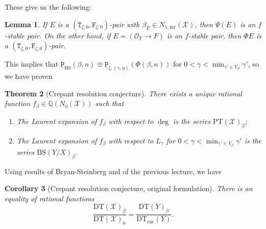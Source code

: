 \documentclass{amsart}
\newtheorem{thm}{Theorem}[section]
\newtheorem{cor}[thm]{Corollary}
\newtheorem{lem}[thm]{Lemma}
\theoremstyle{definition}
\theoremstyle{remark}
\theoremstyle{plain}
\theoremstyle{definition}
\theoremstyle{remark}
\newcommand{\Q}{\mathbb{Q}}
\newcommand{\mc}[1]{\mathcal{#1}}
\newcommand{\mr}[1]{\mathrm{#1}}
\newcommand{\mt}[1]{\mathtt{#1}}
\newcommand{\ul}[1]{\underline{#1}}
\newcommand{\1}{\mathbf{1}}
\newcommand{\2}{\mathbf{2}}
\newcommand{\3}{\mathbf{3}}
\begin{document}
These give us the following:
\begin{lem}
    If $E$ is a $(\mt{T}_{\zeta, 0}, \mt{F}_{\zeta, 0})$-pair with $\beta_E \in N_{1,\mr{mr}}(\mc{X})$, then $\Psi(E)$ is an $f$-stable pair. On the other hand, if $E = (\mc{O}_Y \to F)$ is an $f$-stable pair, then $\Phi E$ is a $(\mt{T}_{\zeta, 0}, \mt{F}_{\zeta, 0})$-pair.
\end{lem}

This implies that $\mt{\ul{P}}_{\mr{BS}}(\beta, n) \cong \mt{\ul{P}}_{\zeta, (\gamma,\eta)}(\Phi(\beta, n))$ for $0 < \gamma < \min_{\gamma' \in V_{\beta}} \gamma'$, so we have proven

\begin{thm}[Crepant resolution conjecture]
    There exists a unique rational function $f_{\beta} \in \Q(N_0(\mc{X}))$ such that
    \begin{enumerate}
        \item The Laurent expansion of $f_{\beta}$ with respect to $\deg$ is the series $\mr{PT}(\mc{X})_{\beta}$;
        \item The Laurent expansion of $f_{\beta}$ with respect to $L_{\gamma}$ for $0 < \gamma < \min_{\gamma' \in V_{\beta}} \gamma'$ is the series $\mr{BS}(Y/X)_{\beta}$.
    \end{enumerate}
\end{thm}

Using results of Bryan-Steinberg and of the previous lecture, we have

\begin{cor}[Crepant resolution conjecture, original formulation]
    There is an equality of rational functions
    \[ \frac{\mr{DT}(\mc{X})_{\beta}}{\mr{DT}(\mc{X})_0} = \frac{\mr{DT}(Y)_{\beta}}{\mr{DT}_{\mr{exc}}(Y)}. \]
\end{cor}
\end{document}
